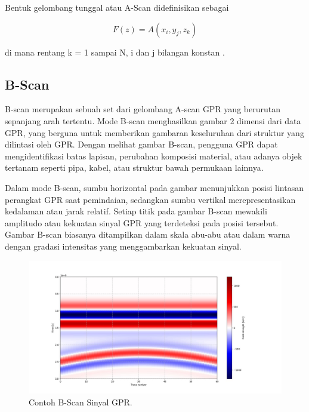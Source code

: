 Bentuk gelombang tunggal atau A-Scan didefinisikan sebagai

\begin{equation}
  \label{eq:Ascan}
  F(z)=A( x_{i} , y_{j} , z_{k} )
\end{equation}

di mana rentang k = 1 sampai N, i dan j bilangan konstan \parencite{danielDvd}.\\

\subsection{B-Scan}
\label{subsec:bScan}

B-scan merupakan sebuah set dari gelombang A-scan GPR yang berurutan sepanjang arah tertentu. 
Mode B-scan menghasilkan gambar 2 dimensi dari data GPR, yang berguna untuk memberikan gambaran keseluruhan dari struktur yang dilintasi oleh GPR.
Dengan melihat gambar B-scan, pengguna GPR dapat mengidentifikasi batas lapisan, perubahan komposisi material, atau adanya objek tertanam seperti pipa, kabel, atau struktur bawah permukaan lainnya.

Dalam mode B-scan, sumbu horizontal pada gambar menunjukkan posisi lintasan perangkat GPR saat pemindaian, sedangkan sumbu vertikal merepresentasikan kedalaman atau jarak relatif. 
Setiap titik pada gambar B-scan mewakili amplitudo atau kekuatan sinyal GPR yang terdeteksi pada posisi tersebut. 
Gambar B-scan biasanya ditampilkan dalam skala abu-abu atau dalam warna dengan gradasi intensitas yang menggambarkan kekuatan sinyal.

\begin{figure}[ht]
  \centering
  \includegraphics[scale=0.45]{gambar/GPRBscan.jpg}
  \caption{Contoh B-Scan Sinyal GPR.}
  \label{fig:BscanGPR}
\end{figure}

